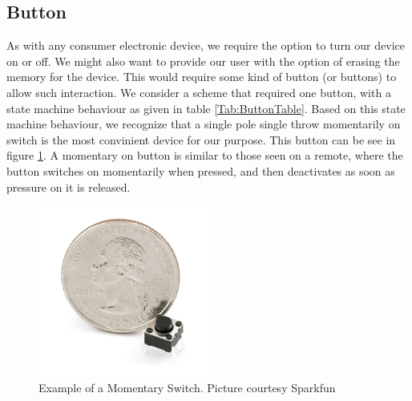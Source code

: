 \subsection{Button}
\label{Sec:Button}
As with any consumer electronic device, we require the option to turn our device on or off. We might also want to provide our user with the option of erasing the memory for the device. This would require some kind of button (or buttons) to allow such interaction. We consider a scheme that required one button, with a state machine behaviour as given in table \ref{Tab:ButtonTable}. Based on this state machine behaviour, we recognize that a single pole single throw momentarily on switch is the most convinient device for our purpose. This button can be see in figure \ref{Fig:MomButton}. A momentary on button is similar to those seen on a remote, where the button switches on momentarily when pressed, and then deactivates as soon as pressure on it is released.
\begin{figure}
\begin{center}
\includegraphics[width=0.5\textwidth]{images/MOMButton.jpg}
\caption{Example of a Momentary Switch. Picture courtesy Sparkfun}
\label{Fig:MomButton}
\end{center}
\end{figure}


